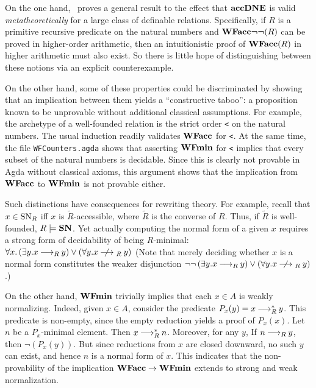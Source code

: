 On the one hand,~\cite{Berardi} proves a general result to the effect that
$\mathbf{accDNE}$ is valid \emph{metatheoretically} for a large class of definable relations.
Specifically, if $R$ is a primitive recursive predicate on the natural numbers and
$\mathbf{WFacc}\boldsymbol{\lnot\lnot}(R)$ can be proved in higher-order arithmetic, then an intuitionistic proof
of $\mathbf{WFacc}(R)$ in higher arithmetic must also exist.
So there is little hope of distinguishing between these notions via an explicit counterexample.

On the other hand, some of these properties could be discriminated
by showing that an implication between them yields a ``constructive taboo'':
a proposition known to be unprovable without additional classical assumptions.
For example, the archetype of a well-founded relation is the strict order \verb|<|
on the natural numbers.  The usual induction readily validates $\mathbf{WFacc}$ for \verb|<|.
  At the same time, the file \texttt{WFCounters.agda} shows that
asserting $\mathbf{WFmin}$ for \verb|<| implies that every subset of the natural numbers is decidable.
Since this is clearly not provable in Agda without classical axioms,
this argument shows that the implication from $\mathbf{WFacc}$ to $\mathbf{WFmin}$ is not provable either.

Such distinctions have consequences for rewriting theory.
For example, recall that $x\in \mathrm{SN}_R$ iff $x$ is $\tilde{R}$-accessible, where $\tilde{R}$
is the converse of $R$.  Thus, if $\tilde{R}$ is well-founded, $R \models \mathbf{SN}$.
Yet actually computing the normal form of a given $x$ requires a
strong form of decidability of being $R$-minimal:
$\forall x. \left(\exists y. x \rstep y \right) \lor \left(\forall y. x \nrstep y\right)$
(Note that merely deciding whether $x$ is a normal form constitutes the weaker disjunction
$\lnot\lnot\left(\exists y. x \rstep y\right) \lor \left(\forall y. x \nrstep y\right)$.)

On the other hand, $\mathbf{WFmin}$ trivially implies that each $x \in A$ is weakly normalizing.
Indeed, given $x \in A$, consider the predicate $P_x(y) = x \mathbin{\longrightarrow_R^*} y$.
This predicate is non-empty, since the empty reduction yields a proof of $P_x(x)$.
Let $n$ be a $P_x$-minimal element.  Then $x \mathbin{\longrightarrow_R^*} n$.  Moreover, for any $y$,
If $n \mathbin{\longrightarrow_R} y$, then $\lnot(P_x(y))$.  But since reductions from $x$ are closed downward,
no such $y$ can exist, and hence $n$ is a normal form of $x$.
This indicates that the non-provability of the implication $\mathbf{WFacc} \to \mathbf{WFmin}$ extends
to strong and weak normalization.

